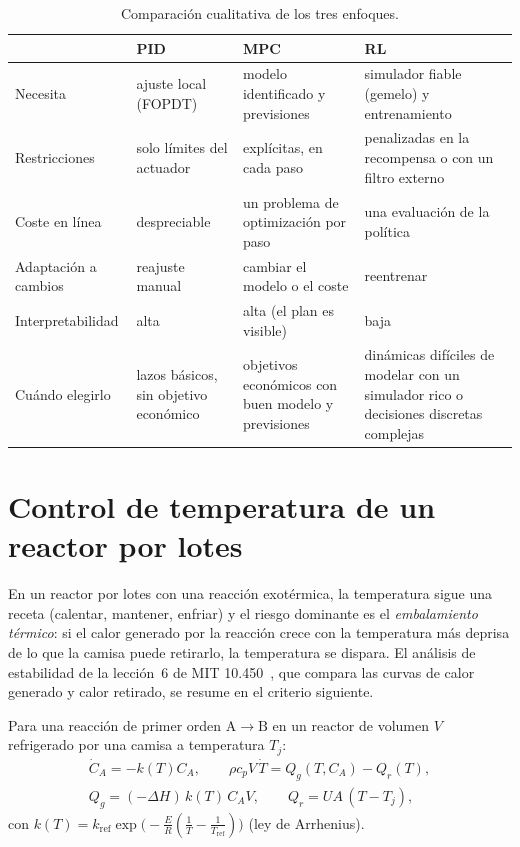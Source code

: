 \begin{table}[htbp]
\centering\small
\begin{tabularx}{\textwidth}{@{}l>{\raggedright\arraybackslash}X>{\raggedright\arraybackslash}X>{\raggedright\arraybackslash}X@{}}
\toprule
& PID & MPC & RL \\
\midrule
Necesita & ajuste local (FOPDT) & modelo identificado y previsiones & simulador fiable (gemelo) y entrenamiento \\
Restricciones & solo límites del actuador & explícitas, en cada paso & penalizadas en la recompensa o con un filtro externo \\
Coste en línea & despreciable & un problema de optimización por paso & una evaluación de la política \\
Adaptación a cambios & reajuste manual & cambiar el modelo o el coste & reentrenar \\
Interpretabilidad & alta & alta (el plan es visible) & baja \\
Cuándo elegirlo & lazos básicos, sin objetivo económico & objetivos económicos con buen modelo y previsiones & dinámicas difíciles de modelar con un simulador rico o decisiones discretas complejas \\
\bottomrule
\end{tabularx}
\caption{Comparación cualitativa de los tres enfoques.}
\label{tab:enfoques}
\end{table}

\section{Control de temperatura de un reactor por lotes}

En un reactor por lotes con una reacción exotérmica, la temperatura sigue una receta (calentar, mantener, enfriar) y el riesgo dominante es el \emph{embalamiento térmico}: si el calor generado por la reacción crece con la temperatura más deprisa de lo que la camisa puede retirarlo, la temperatura se dispara. El análisis de estabilidad de la lección~6 de MIT 10.450~\cite{mit10450}, que compara las curvas de calor generado y calor retirado, se resume en el criterio siguiente.

\begin{definicion}\label{def:reactor}
Para una reacción de primer orden $\mathrm A\to\mathrm B$ en un reactor de volumen $V$ refrigerado por una camisa a temperatura $T_j$:
\[
\begin{gathered}
\dot C_A=-k(T)C_A,\qquad \rho c_pV\,\dot T=Q_g(T,C_A)-Q_r(T),\\
Q_g=(-\Delta H)\,k(T)\,C_AV,\qquad Q_r=UA\,(T-T_j),
\end{gathered}
\]
con $k(T)=k_{\mathrm{ref}}\exp\bigl(-\frac{E}{R}(\frac1T-\frac1{T_{\mathrm{ref}}})\bigr)$ (ley de Arrhenius).
\end{definicion}


